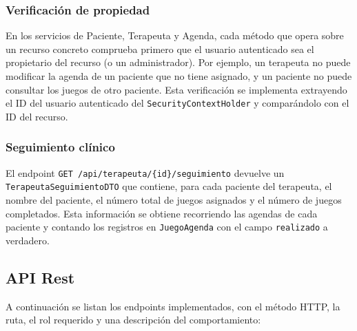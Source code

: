 \subsubsection{Verificación de propiedad}
En los servicios de Paciente, Terapeuta y Agenda, cada método que opera sobre un recurso concreto comprueba primero que el usuario autenticado sea el propietario del recurso (o un administrador). Por ejemplo, un terapeuta no puede modificar la agenda de un paciente que no tiene asignado, y un paciente no puede consultar los juegos de otro paciente. Esta verificación se implementa extrayendo el ID del usuario autenticado del \texttt{SecurityContextHolder} y comparándolo con el ID del recurso.

\subsubsection{Seguimiento clínico}
El endpoint \texttt{GET /api/terapeuta/\{id\}/seguimiento} devuelve un \texttt{TerapeutaSeguimientoDTO} que contiene, para cada paciente del terapeuta, el nombre del paciente, el número total de juegos asignados y el número de juegos completados. Esta información se obtiene recorriendo las agendas de cada paciente y contando los registros en \texttt{JuegoAgenda} con el campo \texttt{realizado} a verdadero.

\subsection{API Rest}
A continuación se listan los endpoints implementados, con el método HTTP, la ruta, el rol requerido y una descripción del comportamiento:

